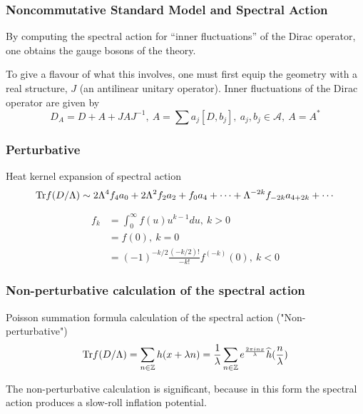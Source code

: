 \documentclass{beamer}
\def\Z{{\mathbb Z}}
\def\cA{{\mathcal A}}
\def\Tr{{\rm Tr}}
\begin{document}
\begin{frame}
  \frametitle{Noncommutative Standard Model and Spectral Action}
  \begin{block}{}
    By computing the spectral action for ``inner fluctuations'' of the Dirac operator, one obtains the gauge bosons of the theory.
  \end{block}

  \begin{block}{}
    To give a flavour of what this involves, one must first equip the geometry with a real structure, $J$ (an antilinear unitary operator). Inner fluctuations of the Dirac operator are given by
    \[
    D_A = D + A + J A J^{-1},~ A = \sum a_j [D, b_j],~ a_j, b_j \in \cA,~ A = A^*
    \]
  \end{block}
\end{frame}

\begin{frame}
  \frametitle{Perturbative}
  \begin{block}{Heat kernel expansion of spectral action}
    \[
      \Tr f (D/\Lambda) \sim 2 \Lambda^4 f_4 a_0 + 2 \Lambda^2 f_2 a_2 + f_0 a_4 + \cdots + \Lambda^{-2k} f_{-2k} a_{4+2k} + \cdots
    \]

    \begin{align*}
      f_k &= \int_{0}^{\infty} f(u) u^{k-1} du, ~ k>0 \\
      &= f(0), ~ k = 0\\
      &= (-1)^{-k/2} \frac{(-k/2)!}{-k!}f^{(-k)}(0), ~ k < 0
    \end{align*}
  \end{block}
\end{frame}

\begin{frame}
  \frametitle{Non-perturbative calculation of the spectral action}
  \begin{block}{Poisson summation formula calculation of the spectral action ("Non-perturbative")}
    \[
      \Tr f (D/\Lambda) = \sum_{n \in \Z} h(x + \lambda n) = \frac{1}{\lambda} \sum_{n \in \Z} e^{\frac{2\pi i n x}{\lambda}}\widehat{h}(\frac{n}{\lambda})
    \]
  \end{block}
  \pause

  \begin{block}{}
	The non-perturbative calculation is significant, because in this form the spectral action produces a slow-roll inflation potential.
  \end{block}
\end{frame}
\end{document}
